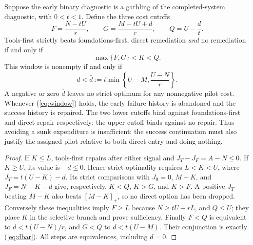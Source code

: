 \begin{proposition}\label{prop:window}
Suppose the early binary diagnostic is a garbling of the completed-system diagnostic, with $0<t<1$. Define the three cost cutoffs
\begin{equation}
 F=\frac{N-tU}{r},\qquad G=\frac{M-tU+d}{r},\qquad Q=U-\frac d t.\label{eq:FGQ}
\end{equation}
Tools-first strictly beats foundations-first, direct remediation \emph{and} no remediation if and only if
\begin{equation}
 \boxed{\quad \max\{F,G\}<K<Q.\quad}\label{eq:window}
\end{equation}
This window is nonempty if and only if
\begin{equation}
 d<\bar d:=t\min\left\{U-M,\frac{U-N}{r}\right\}.\label{eq:dbar}
\end{equation}
A negative or zero $\bar d$ leaves no strict optimum for any nonnegative pilot cost. Whenever (\ref{eq:window}) holds, the early failure history is abandoned and the success history is repaired. The two lower cutoffs bind against foundations-first and direct repair respectively; the upper cutoff binds against no repair. Thus avoiding a sunk expenditure is insufficient: the success continuation must also justify the assigned pilot relative to both direct entry and doing nothing.
\end{proposition}
\begin{proof}
If $K\leq L$, tools-first repairs after either signal and $J_T-J_F=A-N\leq0$. If $K\geq U$, its value is $-d\leq0$. Hence strict optimality requires $L<K<U$, where $J_T=t(U-K)-d$. Its strict comparisons with $J_0=0$, $M-K$, and $J_F=N-K-d$ give, respectively, $K<Q$, $K>G$, and $K>F$. A positive $J_T$ beating $M-K$ also beats $[M-K]_+$, so no direct option has been dropped. Conversely these inequalities imply $F\geq L$ because $N\geq tU+rL$, and $Q\leq U$; they place $K$ in the selective branch and prove sufficiency. Finally $F<Q$ is equivalent to $d<t(U-N)/r$, and $G<Q$ to $d<t(U-M)$. Their conjunction is exactly (\ref{eq:dbar}). All steps are equivalences, including $d=0$.
\end{proof}

